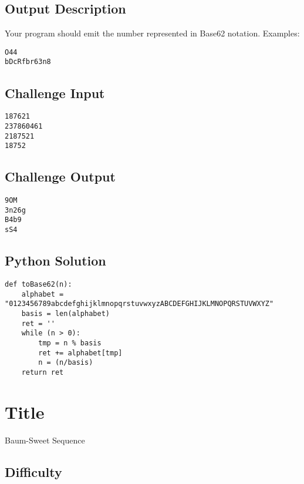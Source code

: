 \subsection{Output Description}\label{output-description-11}

Your program should emit the number represented in Base62 notation.
Examples:

\begin{verbatim}
O44
bDcRfbr63n8
\end{verbatim}

\subsection{Challenge Input}\label{challenge-input-11}

\begin{verbatim}
187621
237860461
2187521
18752
\end{verbatim}

\subsection{Challenge Output}\label{challenge-output-9}

\begin{verbatim}
9OM
3n26g
B4b9
sS4    
\end{verbatim}

\subsection{Python Solution}\label{python-solution}

\begin{verbatim}
def toBase62(n):
    alphabet = "0123456789abcdefghijklmnopqrstuvwxyzABCDEFGHIJKLMNOPQRSTUVWXYZ"
    basis = len(alphabet)
    ret = ''
    while (n > 0):
        tmp = n % basis
        ret += alphabet[tmp]
        n = (n/basis)
    return ret
\end{verbatim}

\section{Title}\label{title-16}

Baum-Sweet Sequence

\subsection{Difficulty}\label{difficulty-15}

